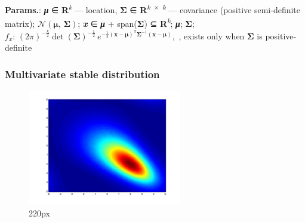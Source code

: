     {\color{darkblue} \textbf{Params.}:} {\textbf{\textit{μ}} ∈ \textbf{R}\textsuperscript{\textit{k}} — location, \textbf{Σ} ∈ \textbf{R}\textsuperscript{\textit{k} × \textit{k}} — covariance (positive semi-definite matrix)}; {$\mathcal{N}(\boldsymbol\mu,\,\boldsymbol\Sigma)$}; {\textbf{\textit{x}} ∈ \textbf{\textit{μ}} + span(\textbf{Σ}) ⊆ \textbf{R}\textsuperscript{\textit{k}}}; {\textbf{\textit{μ}}}; {\textbf{Σ}};\hspace{0.5cm}\\{\color{darkblue} \textbf{$f_x$}:} {$(2\pi)^{-\frac{k}{2}}\det(\boldsymbol\Sigma)^{-\frac{1}{2}} \, e^{ -\frac{1}{2}(\mathbf{x} - \boldsymbol\mu)^{{{\!\mathsf{T}}}} \boldsymbol\Sigma^{-1}(\mathbf{x} - \boldsymbol\mu) },$ , exists only when \textbf{Σ} is positive-definite}



    
        
\subsubsection{Multivariate stable distribution}


    \begin{figure}[H]
        \centering
        \includegraphics[width=0.6\textwidth]{images/Mv stable.png}
        \caption{220px}
    \end{figure}




